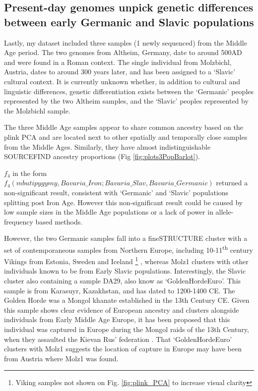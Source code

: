 \subsection{Present-day genomes unpick genetic differences between early Germanic and Slavic populations}

Lastly, my dataset included three samples (1 newly sequenced) from the Middle Age period. The two genomes from Altheim, Germany, date to around 500AD and were found in a Roman context. The single individual from Molzbichl, Austria, dates to around 300 years later, and has been assigned to a `Slavic' cultural context. It is currently unknown whether, in addition to cultural and linguistic differences, genetic differentiation exists between the `Germanic’ peoples represented by the two Altheim samples, and the `Slavic’ peoples represented by the Molzbichl sample.

The three Middle Age samples appear to share common ancestry based on the plink PCA and are located next to other spatially and temporally close samples from the Middle Ages. Similarly, they have almost indistinguishable SOURCEFIND ancestry proportions (Fig \ref{fig:plots3PopBarlot}).

$f_{4}$ in the form $f_{4}(mbutipygymy, Bavaria\_Iron; Bavaria\_Slav, Bavaria\_Germanic)$ returned a non-significant result, consistent with `Germanic' and `Slavic' populations splitting post Iron Age. However this non-significant result could be caused by low sample sizes in the Middle Age populations or a lack of power in allele-frequency based methods.

However, the two Germanic samples fall into a fineSTRUCTURE cluster with a set of contemporaneous samples from Northern Europe, including 10-11\textsuperscript{th} century Vikings from Estonia, Sweden and Iceland \footnote{Viking samples not shown on Fig. \ref{fig:plink_PCA} to increase visual clarity} , whereas Molz1 clusters with other individuals known to be from Early Slavic populations. Interestingly, the Slavic cluster also containing a sample DA29, also know as `GoldenHordeEuro'. This sample is from Karasuyr, Kazakhstan, and has dated to 1200-1400 CE. The Golden Horde was a Mongol khanate established in the 13th Century CE. Given this sample shows clear evidence of European ancestry and clusters alongside individuals from Early Middle Age Europe, it has been proposed that this individual was captured in Europe during the Mongol raids of the 13th Century, when they assaulted the Kievan Rus' federation \cite{de2018137}. That `GoldenHordeEuro' clusters with Molz1 suggests the location of capture in Europe may have been from Austria where Molz1 was found.

